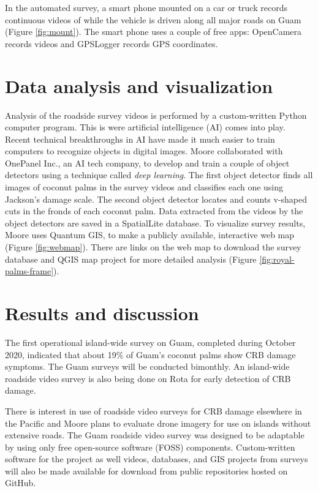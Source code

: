 \documentclass[letterpaper, 11pt]{scrartcl}
\begin{document}
In the automated survey, a smart phone mounted on a car or truck records continuous videos of while the vehicle is driven along all major roads on Guam (Figure \ref{fig:mount}). The smart phone uses a couple of free apps: OpenCamera records videos and GPSLogger records GPS coordinates. 

\section*{Data analysis and visualization} 

Analysis of the roadside survey videos is performed by a custom-written Python computer program. This is were artificial intelligence (AI) comes into play. Recent technical breakthroughs in AI have made it much easier to train computers to recognize objects in digital images. Moore collaborated with OnePanel Inc., an AI tech company, to develop and train a couple of object detectors using a technique called \textit{deep learning}.  The first object detector finds all images of coconut palms in the survey videos and classifies each one using Jackson's damage scale. The second object detector locates and counts v-shaped cuts in the fronds of each coconut palm. Data extracted from the videos by the object detectors are saved in a SpatialLite database. To visualize survey results, Moore uses Quantum GIS, to make a publicly available, interactive web map (Figure \ref{fig:webmap}). There are links on the web map to download the survey database and QGIS map project for more detailed analysis (Figure \ref{fig:royal-palms-frame}).  

\section*{Results and discussion}

The first operational island-wide survey on Guam, completed during October 2020, indicated that about 19\% of Guam's coconut palms show CRB damage symptoms. The Guam surveys will be conducted bimonthly. An island-wide roadside video survey is also being done on Rota for early detection of CRB damage.

There is interest in use of roadside video surveys for CRB damage elsewhere in the Pacific and Moore plans to evaluate drone imagery for use on islands without extensive roads. The Guam roadside video survey was designed to be adaptable by using only free open-source software (FOSS) components. Custom-written software for the project as well videos, databases, and GIS projects from surveys will also be made available for download from public repositories hosted on GitHub.
\end{document}

